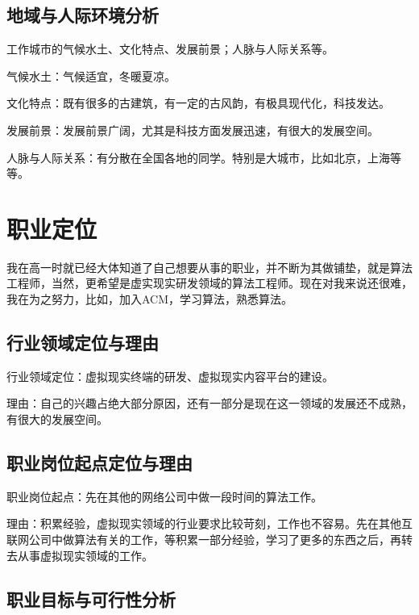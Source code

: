 \documentclass{article}
\begin{document}
\subsection{地域与人际环境分析}
\par
工作城市的气候水土、文化特点、发展前景；人脉与人际关系等。\par
气候水土：气候适宜，冬暖夏凉。\par
文化特点：既有很多的古建筑，有一定的古风韵，有极具现代化，科技发达。\par
发展前景：发展前景广阔，尤其是科技方面发展迅速，有很大的发展空间。\par
人脉与人际关系：有分散在全国各地的同学。特别是大城市，比如北京，上海等等。

\par 

\section{职业定位}
\par
我在高一时就已经大体知道了自己想要从事的职业，并不断为其做铺垫，就是算法工程师，当然，更希望是虚实现实研发领域的算法工程师。现在对我来说还很难，我在为之努力，比如，加入ACM，学习算法，熟悉算法。\par
\subsection{行业领域定位与理由}
\par
行业领域定位：虚拟现实终端的研发、虚拟现实内容平台的建设。\par
理由：自己的兴趣占绝大部分原因，还有一部分是现在这一领域的发展还不成熟，有很大的发展空间。
\par
\subsection{职业岗位起点定位与理由}
\par
职业岗位起点：先在其他的网络公司中做一段时间的算法工作。\par
理由：积累经验，虚拟现实领域的行业要求比较苛刻，工作也不容易。先在其他互联网公司中做算法有关的工作，等积累一部分经验，学习了更多的东西之后，再转去从事虚拟现实领域的工作。\par

\subsection{职业目标与可行性分析}
\par
\end{document}
